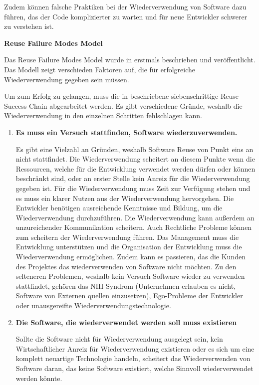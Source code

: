 \documentclass[utf8,biblatex]{lni}
\begin{document}
Zudem können falsche Praktiken bei der Wiederverwendung von Software dazu führen, das der Code komplizierter zu warten und für neue Entwickler schwerer zu verstehen ist.

\textbf{Reuse Failure Modes Model}


Das Reuse Failure Modes Model wurde in \cite{WilliamB.FrakesandChristopherJ.Fox.1996} erstmals beschrieben und veröffentlicht. Das Modell zeigt verschieden Faktoren auf, die für erfolgreiche Wiederverwendung gegeben sein müssen.

Um zum Erfolg zu gelangen, muss die in \cite{WilliamB.FrakesandChristopherJ.Fox.1996} beschriebene siebenschrittige Reuse Success Chain abgearbeitet werden. Es gibt verschiedene Gründe, weshalb die Wiederverwendung in den einzelnen Schritten fehlschlagen kann.
\begin{enumerate}

    \item \textbf{Es muss ein Versuch stattfinden, Software wiederzuverwenden.}
    
    Es gibt eine Vielzahl an Gründen, weshalb Software Reuse von Punkt eins an nicht stattfindet. 
    Die Wiederverwendung scheitert an diesem Punkte wenn die Ressourcen, welche für die Entwicklung verwendet werden dürfen oder können beschränkt sind, oder an erster Stelle kein Anreiz für die Wiederverwendung gegeben ist. Für die Wiederverwendung muss Zeit zur Verfügung stehen und es muss ein klarer Nutzen aus der Wiederverwendung hervorgehen. Die Entwickler benötigen ausreichende Kenntnisse und Bildung, um die Wiederverwendung durchzuführen. Die Wiederverwendung kann außerdem an unzureichender Kommunikation scheitern. Auch Rechtliche Probleme können zum scheitern der Wiederverwendung führen. Das Management muss die Entwicklung unterstützen und die Organisation der Entwicklung muss die Wiederverwendung ermöglichen. Zudem kann es passieren, das die Kunden des Projektes das wiederverwenden von Software nicht möchten. Zu den selteneren Problemen, weshalb kein Versuch Software wieder zu verwenden stattfindet, gehören das NIH-Syndrom (Unternehmen erlauben es nicht, Software von Externen quellen einzusetzen), Ego-Probleme der Entwickler oder unausgereifte Wiederverwendungstechnologie.  
    
    
    \item \textbf{Die Software, die wiederverwendet werden soll muss existieren}
     
    Sollte die Software nicht für Wiederverwendung ausgelegt sein, kein Wirtschaftlicher Anreiz für Wiederverwendung existieren oder es sich um eine komplett neuartige Technologie handeln, scheitert das Wiederverwenden von Software daran, das keine Software existiert, welche Sinnvoll wiederverwendet werden könnte. 
    

\end{enumerate}
\end{document}
